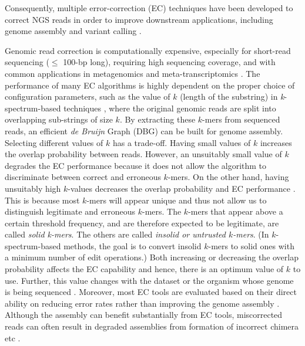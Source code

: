 Consequently, multiple error-correction (EC) techniques have been developed to correct NGS reads in order to improve downstream applications, including genome assembly and variant calling \cite{szalay2015novo}. 

Genomic read correction is computationally expensive, especially for short-read sequencing ($\leq$ 100-bp long), requiring high sequencing coverage, and with common applications in metagenomics and meta-transcriptomics \cite{meyer2017mg,chaterji2017federation}. The performance of many EC algorithms is highly dependent on the proper choice of configuration parameters, such as the value of $k$ (length of the substring) in \textit{k}-spectrum-based techniques \cite{mahadik2017scalable}, where the original genomic reads are split into overlapping sub-strings of size $k$. By extracting these $k$-mers from sequenced reads, an efficient \textit{de Bruijn} Graph (DBG) \cite{compeau2011apply} can be built for genome assembly. Selecting different values of $k$ has a trade-off. Having small values of $k$ increases the overlap probability between reads. However, an unsuitably small value of $k$ degrades the EC performance because it does not allow the algorithm to discriminate between correct and erroneous $k$-mers. On the other hand, having unsuitably high $k$-values decreases the overlap probability and EC performance \cite{sameith2016iterative}. This is because most $k$-mers will appear unique and thus not allow us to distinguish legitimate and erroneous $k$-mers. 
The $k$-mers that appear above a certain threshold frequency, and are therefore expected to be legitimate, are called \textit{solid k-mers}. The others are called \textit{insolid or untrusted $k$-mers}. (In $k$-spectrum-based methods, the goal is to convert insolid $k$-mers to solid ones with a minimum number of edit operations.) Both increasing or decreasing the overlap probability affects the EC capability and hence, there is an optimum value of $k$ to use. Further, this value changes with the dataset or the organism whose genome is being sequenced \cite{heydari2017evaluation}. Moreover, most EC tools are evaluated based on their direct ability on reducing error rates rather than improving the genome assembly \cite{heydari2017evaluation}. Although the assembly can benefit substantially from EC tools, miscorrected reads can often result in degraded assemblies from formation of incorrect chimera etc \cite{heydari2017evaluation}.
